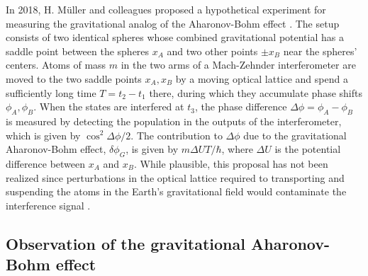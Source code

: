 \documentclass[reprint,
nofootinbib,
amsmath,amssymb,
aps]{revtex4-1}
\begin{document}
In 2018, H. M\"{u}ller and colleagues proposed a hypothetical experiment for measuring the gravitational analog of the Aharonov-Bohm effect \cite{hohensee2012force}. The setup  
consists of two identical spheres whose combined gravitational potential has a saddle point between the spheres $x_A$ and two other points $\pm x_B$ near the spheres' centers. Atoms of mass $m$ in the two arms of a Mach-Zehnder interferometer are moved to the two saddle points $x_A,x_B$ by a moving optical lattice and spend a sufficiently long time $T = t_2- t_1$ there, during which they accumulate phase shifts $\phi_A, \phi_B$. When the states are interfered at $t_3$, the phase difference $\Delta \phi = \phi_A - \phi_B$ is measured by detecting the population in the outputs of the interferometer, which is given by $\cos^2\Delta \phi/2$. The contribution to $\Delta \phi$ due to the gravitational Aharonov-Bohm effect, $\delta \phi_G$, is given by $m\Delta U T/\hbar$, where $\Delta U$ is the potential difference between $x_A$ and $x_B$.  While plausible, this proposal has not been realized since perturbations in the optical lattice required to transporting and suspending the atoms in the Earth's gravitational field would contaminate the interference signal \cite{roura2022quantum}.  










\subsection{Observation of the gravitational Aharonov-Bohm effect}
\end{document}
